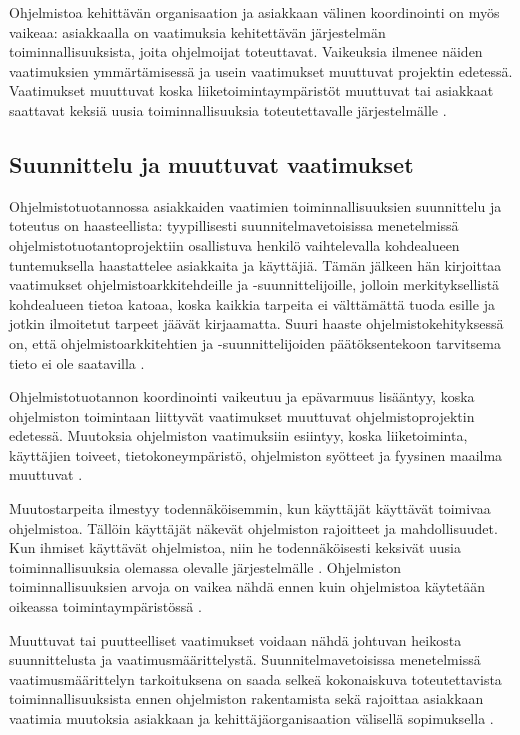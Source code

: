 \documentclass[finnish]{tktltiki2}
\theoremstyle{definition}
\theoremstyle{remark}
\begin{document}
Ohjelmistoa kehittävän organisaation ja asiakkaan välinen koordinointi on myös vaikeaa: asiakkaalla on vaatimuksia kehitettävän järjestelmän toiminnallisuuksista, joita ohjelmoijat toteuttavat. Vaikeuksia ilmenee näiden vaatimuksien ymmärtämisessä ja usein vaatimukset muuttuvat projektin edetessä. Vaatimukset muuttuvat koska liiketoimintaympäristöt muuttuvat tai asiakkaat saattavat keksiä uusia toiminnallisuuksia toteutettavalle järjestelmälle \cite{FOW01a}.

\subsection{Suunnittelu ja muuttuvat vaatimukset}

Ohjelmistotuotannossa asiakkaiden vaatimien toiminnallisuuksien suunnittelu ja toteutus on haasteellista: tyypillisesti suunnitelmavetoisissa menetelmissä ohjelmistotuotantoprojektiin osallistuva henkilö vaihtelevalla kohdealueen tuntemuksella haastattelee asiakkaita ja käyttäjiä. Tämän jälkeen hän kirjoittaa vaatimukset ohjelmistoarkkitehdeille ja -suunnittelijoille, jolloin merkityksellistä kohdealueen tietoa katoaa, koska kaikkia tarpeita ei välttämättä tuoda esille ja jotkin ilmoitetut tarpeet jäävät kirjaamatta. Suuri haaste ohjelmistokehityksessä on, että ohjelmistoarkkitehtien ja -suunnittelijoiden päätöksentekoon tarvitsema tieto ei ole saatavilla \cite{KES95}.

Ohjelmistotuotannon koordinointi vaikeutuu ja epävarmuus lisääntyy, koska ohjelmiston toimintaan liittyvät vaatimukset muuttuvat ohjelmistoprojektin edetessä. Muutoksia ohjelmiston vaatimuksiin esiintyy, koska liiketoiminta, käyttäjien toiveet, tietokoneympäristö, ohjelmiston syötteet ja fyysinen maailma muuttuvat \cite{KES95}.

Muutostarpeita ilmestyy todennäköisemmin, kun käyttäjät käyttävät toimivaa ohjelmistoa. Tällöin käyttäjät näkevät ohjelmiston rajoitteet ja mahdollisuudet. Kun ihmiset käyttävät ohjelmistoa, niin he todennäköisesti keksivät uusia toiminnallisuuksia olemassa olevalle järjestelmälle \cite{KES95}. Ohjelmiston toiminnallisuuksien arvoja on vaikea nähdä ennen kuin ohjelmistoa käytetään oikeassa toimintaympäristössä \cite{FOW01a}.

Muuttuvat tai puutteelliset vaatimukset voidaan nähdä johtuvan heikosta suunnittelusta ja vaatimusmäärittelystä. Suunnitelmavetoisissa menetelmissä vaatimusmäärittelyn tarkoituksena on saada selkeä kokonaiskuva toteutettavista toiminnallisuuksista ennen ohjelmiston rakentamista sekä rajoittaa asiakkaan vaatimia muutoksia asiakkaan ja kehittäjäorganisaation välisellä sopimuksella \cite{FOW01a}.
\end{document}
